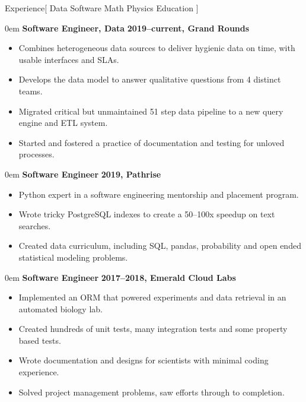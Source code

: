 \documentclass[11pt,a4paper]{article}
\newenvironment{headedsection}[2]{
    \begin{addmargin}[0.5em]{0em}
    {\large\bfseries #1} \hfill {\bfseries #2}%
    \begin{itemize}
        [label={}, topsep=0pt, itemsep=1.5pt, parsep=0pt, leftmargin=1.5em]
}{
    \end{itemize}
    \end{addmargin}
    \medskip
}
\begin{document}
\sloppy  %


\vspace{1em}

\begin{mysection}{Experience}[
    Data
    \textbullet{} Software
    \textbullet{} Math
    \textbullet{} Physics
    \textbullet{} Education
]

  \begin{headedsection}
        {Software Engineer, Data}
        {2019--current, Grand Rounds}

    \item Combines heterogeneous data sources to deliver hygienic data on time,
          with usable interfaces and SLAs.
    \item Develops the data model to answer qualitative questions from 4
          distinct teams.
    \item Migrated critical but unmaintained 51 step data pipeline to a new
          query engine and ETL system.
    \item Started and fostered a practice of documentation and testing for
          unloved processes.

  \end{headedsection}

  \begin{headedsection}
        {Software Engineer}
        {2019, Pathrise}

    \item Python expert in a software engineering mentorship and placement
          program.
    \item Wrote tricky PostgreSQL indexes to create a 50--100x speedup on text
          searches.
    \item Created data curriculum, including SQL, pandas, probability and open
          ended statistical modeling problems.

  \end{headedsection}

  \begin{headedsection}
        {Software Engineer}
        {2017--2018, Emerald Cloud Labs}

    \item Implemented an ORM that powered experiments and data retrieval in an
          automated biology lab.
    \item Created hundreds of unit tests, many integration tests and some
          property based tests.
    \item Wrote documentation and designs for scientists with minimal coding
          experience.
    \item Solved project management problems, saw efforts through to completion.


\end{headedsection}
\end{mysection}
\end{document}
